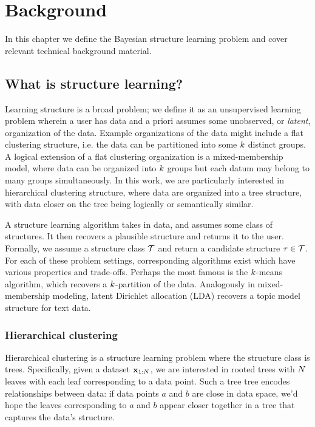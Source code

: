 \chapter{Background}
In this chapter we define the Bayesian structure learning problem and cover relevant technical background material.

\section{What is structure learning?}
Learning structure is a broad problem; we define it as an unsupervised learning problem wherein a user has data
and a priori assumes some unobserved, or \emph{latent}, organization of the data. Example organizations of the data might include a flat clustering structure, i.e. the data can be partitioned into some $k$ distinct groups. A logical extension of a flat clustering organization is a mixed-membership model, where data can be organized into $k$ groups but each datum may belong to many groups simultaneously. 
In this work, we are particularly interested in hierarchical clustering structure, where data are organized into a tree structure, with data closer on the tree being logically or semantically similar.

A structure learning algorithm takes in data, and assumes some class of structures. It then recovers a plausible structure and returns it to the user. Formally, we assume a structure class $\mathcal{T}$ and return a candidate structure $\tau \in \mathcal{T}$.
For each of these problem settings, corresponding algorithms exist which have various properties and trade-offs. 
Perhaps the most famous is the $k$-means algorithm, which recovers a $k$-partition of the data.  Analogously in mixed-membership modeling, latent Dirichlet allocation (LDA) recovers a topic model structure for text data.

\subsection{Hierarchical clustering}
Hierarchical clustering is a structure learning problem
where the structure class is trees. Specifically,
given a dataset $\mathbf{x}_{1:N}$,
we are interested in rooted trees with $N$ leaves
with each leaf corresponding to a data point.
Such a tree tree encodes relationships between data: 
if data points $a$ and $b$ are close in data space, we'd hope
the leaves corresponding to $a$ and $b$ appear closer
together in a tree that captures the data's structure.

